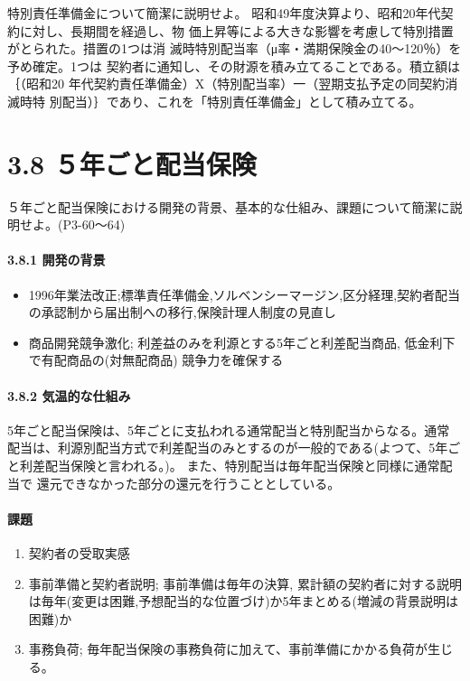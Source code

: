 \documentclass[report,gutter=10mm,fore-edge=10mm,uplatex,dvipdfmx]{jlreq}
\begin{document}
特別責任準備金について簡潔に説明せよ。
昭和49年度決算より、昭和20年代契約に対し、長期間を経過し、物
価上昇等による大きな影響を考慮して特別措置がとられた。措置の1つは消
滅時特別配当率（μ率・満期保険金の40〜120％）を予め確定。1つは
契約者に通知し、その財源を積み立てることである。積立額は｛（昭和20
年代契約責任準備金）X（特別配当率）一（翌期支払予定の同契約消滅時特
別配当）｝であり、これを「特別責任準備金」として積み立てる。

\section{3.8 ５年ごと配当保険}
５年ごと配当保険における開発の背景、基本的な仕組み、課題について簡潔に説明せよ。(P3-60〜64)

\paragraph{3.8.1 開発の背景}
\begin{itemize}
 \item 1996年業法改正;標準責任準備金,ソルベンシーマージン,区分経理,契約者配当の承認制から届出制への移行,保険計理人制度の見直し
 \item 商品開発競争激化; 利差益のみを利源とする5年ごと利差配当商品, 低金利下で有配商品の(対無配商品) 競争力を確保する
\end{itemize}
\paragraph{3.8.2 気温的な仕組み}

5年ごと配当保険は、5年ごとに支払われる通常配当と特別配当からなる。通常
配当は、利源別配当方式で利差配当のみとするのが一般的である(よつて、5年ご
と利差配当保険と言われる。)。
また、特別配当は毎年配当保険と同様に通常配当で
還元できなかった部分の還元を行うこととしている。

\paragraph{課題}

\begin{enumerate} [(1)]
 \item 契約者の受取実感
 \item 事前準備と契約者説明; 事前準備は毎年の決算, 累計額の契約者に対する説明は毎年(変更は困難,予想配当的な位置づけ)か5年まとめる(増減の背景説明は困難)か
 \item 事務負荷; 毎年配当保険の事務負荷に加えて、事前準備にかかる負荷が生じる。
\end{enumerate}
\end{document}
